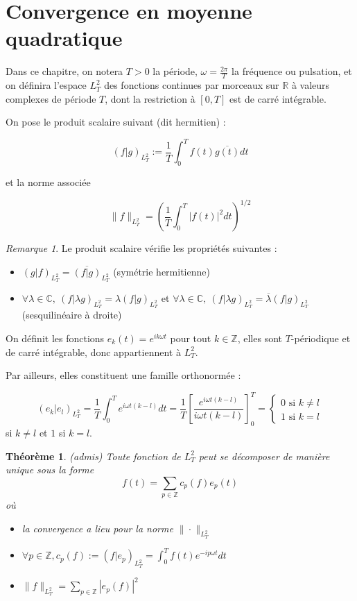 \documentclass[]{article}
\newtheorem{mythm}{Théorème}
\theoremstyle{remark}
\newtheorem{myrem}{Remarque}
\theoremstyle{definition}
\begin{document}
\section{Convergence en moyenne quadratique}

Dans ce chapitre, on notera $T > 0$ la période, $\displaystyle \omega = \frac{2 \pi}{T}$ la fréquence ou pulsation, et on définira l'espace $L_T^2$ des fonctions continues par morceaux sur $\mathbb{R}$ à valeurs complexes de période $T$, dont la restriction à $[0, T]$ est de carré intégrable.

On pose le produit scalaire suivant (dit hermitien) :

$$(f|g)_{L_T^2} := \frac{1}{T}\int_{0}^{T} f(t)\overline{g(t)} dt$$

et la norme associée

$$\|f\|_{L_T^2} = \left(\frac{1}{T}\int_{0}^{T} |f(t)|^2 dt\right)^{1/2}$$

\begin{myrem}
	\leavevmode
	Le produit scalaire vérifie les propriétés suivantes :
	\begin{itemize}
		\item $(g | f)_{L_T^2} = \overline{(f | g)}_{L_T^2}$ (symétrie hermitienne)
		\item $\forall \lambda \in \mathbb{C}, ~ (f | \lambda g)_{L_T^2} = \lambda(f | g)_{L_T^2}$ et $\forall \lambda \in \mathbb{C}, ~ (f | \lambda g)_{L_T^2} = \overline{\lambda}(f | g)_{L_T^2}$ (sesquilinéaire à droite)
	\end{itemize}
\end{myrem}

On définit les fonctions $e_k(t) = e^{i k \omega t}$ pour tout $k \in \mathbb{Z}$, elles sont $T$-périodique et de carré intégrable, donc appartiennent à $L_T^2$.

Par ailleurs, elles constituent une famille orthonormée :

$$(e_k|e_l)_{L_T^2} = \frac{1}{T} \int_{0}^{T} e^{i \omega t (k-l)}dt = \frac{1}{T} \left[\frac{e^{i \omega t (k-l)}}{i \omega t (k-l)}\right]^T_0 = \left\{
\begin{array}{l}
	0 \text{ si } k \neq l \\
	1 \text{ si } k = l
\end{array}\right.$$ si $k \neq l$ et $1$ si $k=l$.

\newpage
\begin{mythm} (admis) Toute fonction de $L_{T}^2$ peut se décomposer de manière unique sous la forme $$f(t) = \sum_{p \in \mathbb{Z}} c_p(f) e_p(t)$$
	où
	\begin{itemize}
		\item la convergence a lieu pour la norme $\|\cdot\|_{L_T^2}$
		\item $\forall p \in \mathbb{Z}, c_p(f):=(f|e_p)_{L^2_T} = \displaystyle \int_0^T f(t)e^{-i p \omega t} dt$
		\item $\|f\|_{L_T^2} = \sum_{p \in \mathbb{Z}} |e_p(f)|^2$
	\end{itemize}
\end{mythm}
\end{document}
